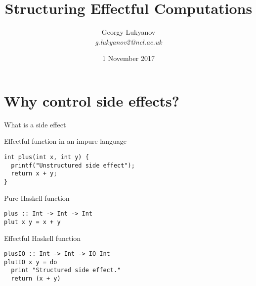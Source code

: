 

\usepackage[cache=false]{minted}

\title[]{Structuring Effectful Computations}

\subtitle{}




\author[Georgy\,Lukyanov]
{%
  \texorpdfstring{
      Georgy Lukyanov\\ \scriptsize{\textit{g.lukyanov2@ncl.ac.uk}}
  }
  {Georgy Lukyanov}
}

\date{1 November 2017}%




\begin{frame}
\titlepage
\end{frame}


\section{Why control side effects?}

\begin{frame}[fragile]{What is a side effect}
  \begin{block}{Effectful function in an impure language}
  \begin{verbatim}
int plus(int x, int y) {
  printf("Unstructured side effect");
  return x + y;
}
  \end{verbatim}
  \end{block}
  \begin{block}{Pure Haskell function}
  \begin{verbatim}
plus :: Int -> Int -> Int
plut x y = x + y
  \end{verbatim}
  \end{block}
  \begin{block}{Effectful Haskell function}
  \begin{verbatim}
plusIO :: Int -> Int -> IO Int
plutIO x y = do
  print "Structured side effect."
  return (x + y)
  \end{verbatim}
  \end{block}
\end{frame}

